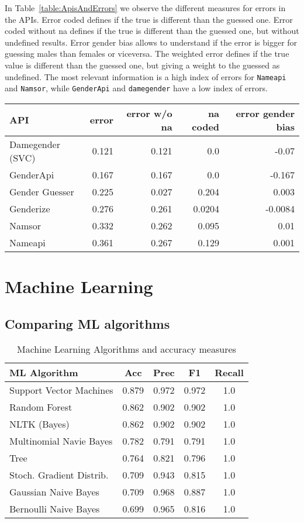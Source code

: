 \documentclass[a4paper]{article}
\begin{document}
In Table~\ref{table:ApisAndErrors} we observe the different measures for errors in the APIs.
Error coded defines if the true is different than the guessed one. 
Error coded without na defines if the true is different than the guessed one, but without undefined results.
Error gender bias allows to understand if the error is bigger for guessing males than females or viceversa.
The weighted error defines if the true value is different than the guessed one, but giving a weight to the guessed as undefined.
The most relevant information is a high index of errors for \texttt{Nameapi} and \texttt{Namsor},
while \texttt{GenderApi} and \texttt{damegender} have a low index of errors.

\begin{table*}
\footnotesize
\center
\begin{tabular}[]{lrrrr}
\hline
API & error & error w/o na & na coded & error gender bias\tabularnewline
\hline
Damegender (SVC)\footnotemark[1] & 0.121 & 0.121 & 0.0 & -0.07\tabularnewline
GenderApi & 0.167 & 0.167 & 0.0 & -0.167\tabularnewline
Gender Guesser & 0.225 & 0.027 & 0.204 & 0.003\tabularnewline
Genderize & 0.276 & 0.261 & 0.0204 & -0.0084 \tabularnewline 
Namsor & 0.332 & 0.262 & 0.095 & 0.01 \tabularnewline
Nameapi & 0.361 & 0.267 & 0.129 & 0.001 \tabularnewline
\hline
\end{tabular}
\caption{APIs and Errors}
\label{table:ApisAndErrors}
\end{table*}


\section{Machine Learning}

\subsection{Comparing ML algorithms}

\begin{table}
\footnotesize
\center
\begin{tabular}[]{lcccc}
  \hline
  ML Algorithm & Acc & Prec & F1 & Recall \tabularnewline
  \hline
 Support Vector Machines             &    0.879 &     0.972 &   0.972 &    1.0  \tabularnewline
 Random Forest                       &    0.862 &     0.902 &   0.902 &    1.0  \tabularnewline
 NLTK (Bayes)                        &    0.862 &     0.902 &   0.902 &    1.0  \tabularnewline
 Multinomial Navie Bayes             &    0.782 &     0.791 &   0.791 &    1.0  \tabularnewline
 Tree                                &    0.764 &     0.821 &   0.796 &    1.0  \tabularnewline
 Stoch. Gradient Distrib.    &    0.709 &     0.943 &   0.815 &    1.0  \tabularnewline
 Gaussian Naive Bayes                &    0.709 &     0.968 &   0.887 &    1.0  \tabularnewline
 Bernoulli Naive Bayes               &    0.699 &     0.965 &   0.816 &    1.0  \tabularnewline
 
\hline
\end{tabular}
\caption{Machine Learning Algorithms and accuracy measures}
\label{table:MLAccuracies}
\end{table}
\end{document}
